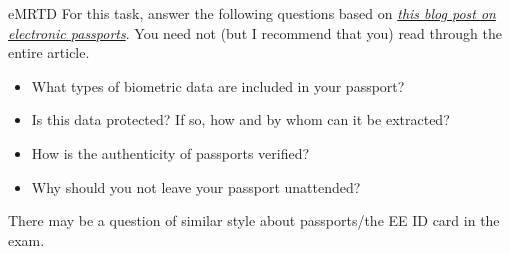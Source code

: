 \documentclass{homework}
\begin{document}
\begin{task}{eMRTD}
  For this task, answer the following questions based on \textit{\href{https://blog.trailofbits.com/2025/10/31/the-cryptography-behind-electronic-passports/}{this blog post on electronic passports}}.
  You need not (but I recommend that you) read through the entire article.
  \begin{itemize}
    \item What types of biometric data are included in your passport?
    \item Is this data protected?
    If so, how and by whom can it be extracted?
    \item How is the authenticity of passports verified?
    \item Why should you not leave your passport unattended?
  \end{itemize}

  There may be a question of similar style about passports/the EE ID card in the exam.
\end{task}
\end{document}
